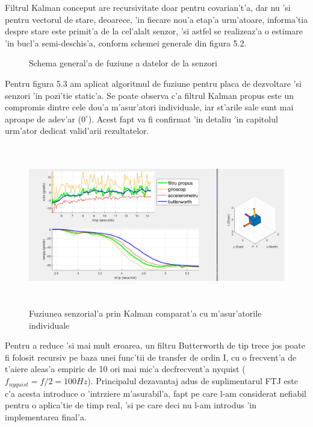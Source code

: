 \documentclass[12pt,a4paper,twoside]{report}
\begin{document}
\vspace{5px}

Filtrul Kalman conceput are recursivitate doar pentru covarian't'a, dar nu 'si pentru vectorul de stare, deoarece, 'in fiecare nou'a etap'a urm'atoare, informa'tia despre stare este primit'a de la cel'alalt senzor, 'si astfel se realizeaz'a o estimare 'in bucl'a semi-deschis'a, conform schemei generale din figura 5.2.

\begin{figure}[h]
\centering
 
 \caption{Schema general'a de fuziune a datelor de la senzori}
\end{figure}

Pentru figura 5.3 am aplicat algoritmul de fuziune pentru placa de dezvoltare 'si senzori 'in pozi'tie static'a. Se poate observa c'a filtrul Kalman propus este un compromis dintre cele dou'a m'asur'atori individuale, iar st'arile sale sunt mai aproape de adev'ar ($ 0^{\circ}$). Acest fapt va fi confirmat 'in detaliu 'in capitolul urm'ator dedicat valid'arii rezultatelor.

\begin{figure}[h]
\centering
 \includegraphics[width=150mm,height=70mm,]{img/Pitch}
 \caption{Fuziunea senzorial'a prin Kalman comparat'a cu m'asur'atorile individuale}
\end{figure}

Pentru a reduce 'si mai mult eroarea, un filtru Butterworth \cite{butter} de tip trece jos poate fi folosit recursiv pe baza unei func'tii de transfer de ordin I, cu o frecvent'a de t'aiere aleas'a empiric de 10 ori mai mic'a dec\ia frecvent'a nyquist ($f_{nyquist} = f/2 = 100 Hz$). Principalul dezavantaj adus de suplimentarul FTJ este c'a acesta introduce o 'int\ia rziere m'asurabil'a, fapt pe care l-am considerat nefiabil pentru o aplica'tie de timp real, 'si pe care deci nu l-am introdus 'in implementarea final'a. 
\end{document}
